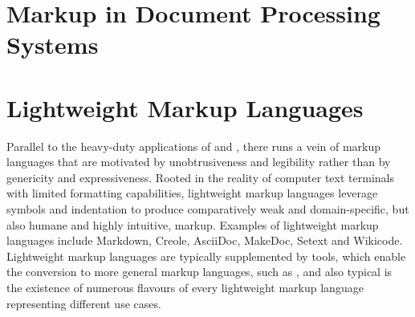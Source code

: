 \documentclass{book}
\begin{document}

        
      \section{Markup in Document Processing Systems}

      \section{Lightweight Markup Languages}
        
        Parallel to the heavy-duty applications of  and
        , there runs a vein of markup languages that are motivated
        by unobtrusiveness and legibility rather than by genericity and
        expressiveness. Rooted in the reality of computer text terminals with
        limited formatting capabilities, lightweight markup languages leverage
        symbols and indentation to produce comparatively weak and
        domain-specific, but also humane and highly intuitive, markup.  Examples
        of lightweight markup languages include Markdown, Creole, AsciiDoc,
        MakeDoc, Setext and Wikicode. Lightweight markup languages are typically
        supplemented by tools, which enable the conversion to more general
        markup languages, such as , and also typical is the
        existence of numerous flavours of every lightweight markup language
        representing different use cases.
\end{document}
